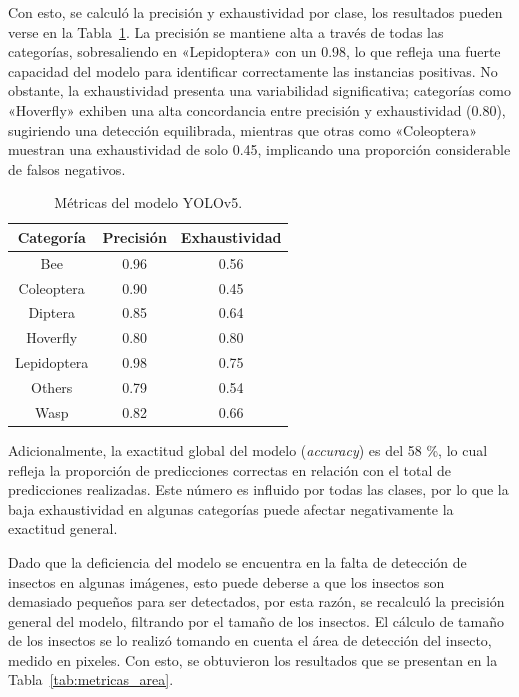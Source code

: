 Con esto, se calculó la precisión y exhaustividad por clase, los resultados pueden verse en la Tabla~\ref{tab:metricas}. La precisión se mantiene alta a través de todas las categorías, sobresaliendo en «Lepidoptera» con un 0.98, lo que refleja una fuerte capacidad del modelo para identificar correctamente las instancias positivas. No obstante, la exhaustividad presenta una variabilidad significativa; categorías como «Hoverfly» exhiben una alta concordancia entre precisión y exhaustividad (0.80), sugiriendo una detección equilibrada, mientras que otras como «Coleoptera» muestran una exhaustividad de solo 0.45, implicando una proporción considerable de falsos negativos.



\begin{table}[H]
    \centering\small
    \begin{tabular}{ccc}
        \toprule
        \textbf{Categoría} & \textbf{Precisión}  &  \textbf{Exhaustividad}\\ 
        \midrule
        Bee &  0.96 &  0.56 \\
        Coleoptera &  0.90 &  0.45 \\
        Diptera &  0.85 &  0.64 \\
        Hoverfly &  0.80 &  0.80 \\
        Lepidoptera &  0.98 &  0.75 \\
        Others &  0.79 &  0.54 \\
        Wasp &  0.82 &  0.66 \\
        \bottomrule
    \end{tabular}
    \caption{Métricas del modelo YOLOv5.}
    \label{tab:metricas}
\end{table}

\pagebreak

Adicionalmente, la exactitud global del modelo (\textit{accuracy}) es del 58 \%, lo cual refleja la proporción de predicciones correctas en relación con el total de predicciones realizadas. Este número es influido por todas las clases, por lo que la baja exhaustividad en algunas categorías puede afectar negativamente la exactitud general. 

Dado que la deficiencia del modelo se encuentra en la falta de detección de insectos en algunas imágenes, esto puede deberse a que los insectos son demasiado pequeños para ser detectados, por esta razón, se recalculó la precisión general del modelo, filtrando por el tamaño de los insectos. El cálculo de tamaño de los insectos se lo realizó tomando en cuenta el área de detección del insecto, medido en pixeles. Con esto, se obtuvieron los resultados que se presentan en la Tabla~\ref{tab:metricas_area}.

